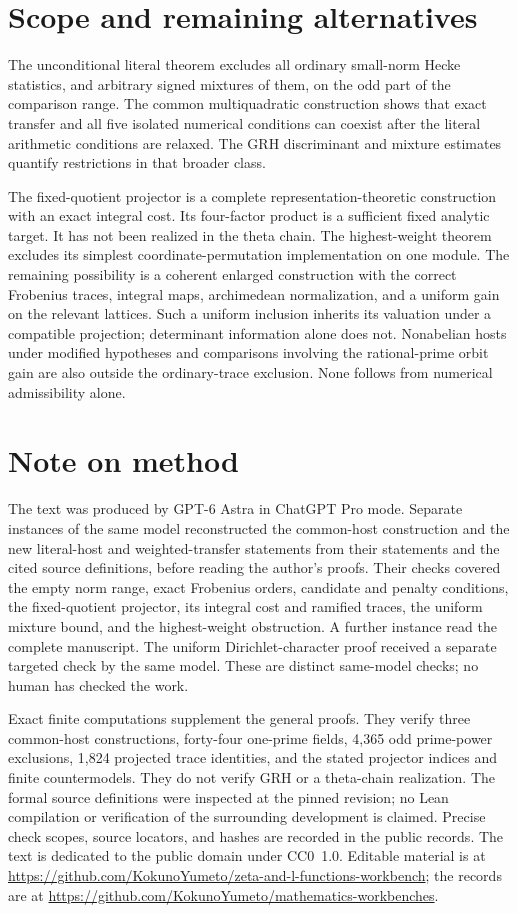 \documentclass[11pt]{article}
\theoremstyle{remark}\newtheorem{remark}[theorem]{Remark}
\newcommand{\workbenchurl}{https://github.com/KokunoYumeto/zeta-and-l-functions-workbench}
\newcommand{\recordurl}{https://github.com/KokunoYumeto/mathematics-workbenches}
\begin{document}
\section{Scope and remaining alternatives}
The unconditional literal theorem excludes all ordinary small-norm
Hecke statistics, and arbitrary signed mixtures of them, on the odd
part of the comparison range. The common multiquadratic construction
shows that exact transfer and all five isolated numerical conditions
can coexist after the literal arithmetic conditions are relaxed.
The GRH discriminant and mixture estimates quantify restrictions in
that broader class.

The fixed-quotient projector is a complete representation-theoretic
construction with an exact integral cost. Its four-factor product is
a sufficient fixed analytic target. It has not been realized in the
theta chain. The highest-weight theorem excludes its simplest
coordinate-permutation implementation on one module. The remaining
possibility is a coherent enlarged construction with the correct
Frobenius traces, integral maps, archimedean normalization, and a
uniform gain on the relevant lattices. Such a uniform inclusion
inherits its valuation under a compatible projection; determinant
information alone does not. Nonabelian hosts under modified hypotheses and
comparisons involving the rational-prime orbit gain are also
outside the ordinary-trace exclusion. None follows from numerical
admissibility alone.

\section*{Note on method}
The text was produced by GPT-6 Astra in ChatGPT Pro mode. Separate
instances of the same model reconstructed the common-host construction
and the new literal-host and weighted-transfer statements from their
statements and the cited source definitions, before reading the
author's proofs. Their checks covered the empty norm range, exact
Frobenius orders, candidate and penalty conditions, the fixed-quotient
projector, its integral cost and ramified traces, the uniform mixture
bound, and the highest-weight obstruction. A further instance read
the complete manuscript. The uniform Dirichlet-character proof received a separate
targeted check by the same model. These are
distinct same-model checks; no human has checked the work.

Exact finite computations supplement the general proofs. They verify
three common-host constructions, forty-four one-prime fields,
4,365 odd prime-power exclusions, 1,824 projected trace identities,
and the stated projector indices and finite countermodels. They do
not verify GRH or a theta-chain realization. The formal source
definitions were inspected at the pinned revision; no Lean
compilation or verification of the surrounding development is claimed.
Precise check scopes, source locators, and hashes are recorded in the
public records. The text is dedicated to the public domain under
CC0~1.0. Editable material is at
\expandafter\url\expandafter{\workbenchurl}; the records are at
\expandafter\url\expandafter{\recordurl}.
\end{document}
